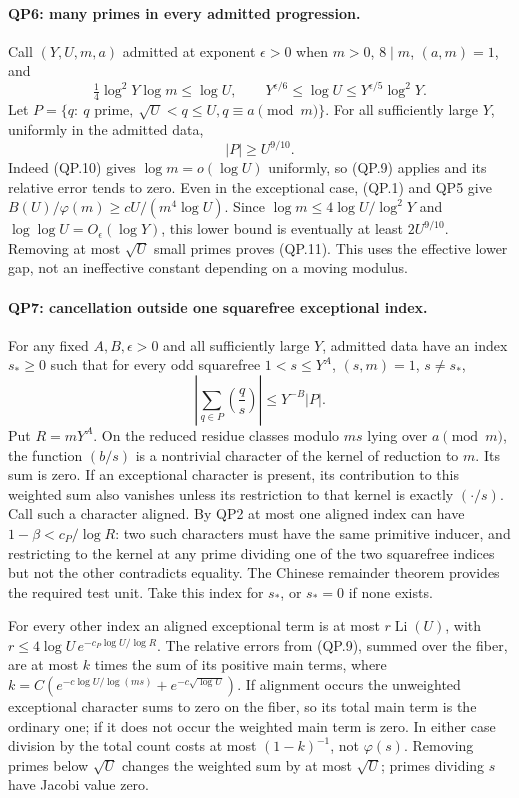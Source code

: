 \paragraph{QP6: many primes in every admitted progression.}
Call $(Y,U,m,a)$ admitted at exponent $\epsilon>0$ when
$m>0$, $8\mid m$, $(a,m)=1$, and
\[
 \tfrac14\log^2Y\log m\le\log U,\qquad
 Y^{\epsilon/6}\le\log U\le Y^{\epsilon/5}\log^2Y.     \tag{QP.10}
\]
Let $P=\{q:\ q\text{ prime},\ \sqrt U<q\le U, q\equiv a\pmod m\}$.
For all sufficiently large $Y$, uniformly in the admitted data,
\[
                         |P|\ge U^{9/10}.              \tag{QP.11}
\]
Indeed (QP.10) gives $\log m=o(\log U)$ uniformly, so (QP.9) applies
and its relative error tends to zero.  Even in the exceptional case,
(QP.1) and QP5 give
$B(U)/\varphi(m)\ge cU/(m^4\log U)$.
Since $\log m\le4\log U/\log^2Y$ and
$\log\log U=O_\epsilon(\log Y)$, this lower bound is eventually
at least $2U^{9/10}$.  Removing at most $\sqrt U$ small primes proves
(QP.11).  This uses the effective lower gap, not an ineffective
constant depending on a moving modulus.

\paragraph{QP7: cancellation outside one squarefree exceptional index.}
For any fixed $A,B,\epsilon>0$ and all sufficiently large $Y$, admitted
data have an index $s_*\ge0$ such that for every odd squarefree
$1<s\le Y^A$, $(s,m)=1$, $s\ne s_*$,
\[
 \left|\sum_{q\in P}\left(\frac qs\right)\right|
                                        \le Y^{-B}|P|.\tag{QP.12}
\]
Put $R=mY^A$.  On the reduced residue classes modulo $ms$ lying over
$a\pmod m$, the function $(b/s)$ is a nontrivial character of the
kernel of reduction to $m$.  Its sum is zero.  If an exceptional
character is present, its contribution to this weighted sum also
vanishes unless its restriction to that kernel is exactly $(\cdot/s)$.
Call such a character aligned.  By QP2 at most one aligned index can
have $1-\beta<c_P/\log R$: two such characters must have the same
primitive inducer, and restricting to the kernel at any prime dividing
one of the two squarefree indices but not the other contradicts equality.
The Chinese remainder theorem provides the required test unit.
Take this index for $s_*$, or $s_*=0$ if none exists.

For every other index an aligned exceptional term is at most
$r\operatorname{Li}(U)$, with
$r\le4\log U\,e^{-c_P\log U/\log R}$.
The relative errors from (QP.9), summed over the fiber, are at most
$k$ times the sum of its positive main terms, where
$k=C(e^{-c\log U/\log(ms)}+e^{-c\sqrt{\log U}})$.
If alignment occurs the unweighted exceptional character sums to zero
on the fiber, so its total main term is the ordinary one; if it does
not occur the weighted main term is zero.  In either case division by
the total count costs at most $(1-k)^{-1}$, not $\varphi(s)$.
Removing primes below $\sqrt U$ changes the weighted sum by at most
$\sqrt U$; primes dividing $s$ have Jacobi value zero.


